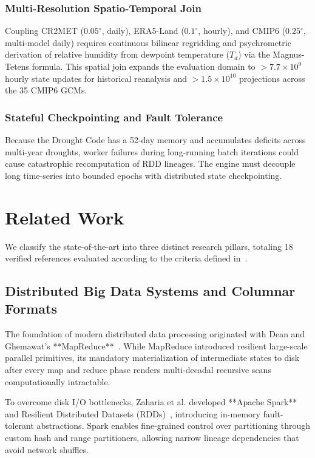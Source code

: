 \documentclass[10pt,conference]{IEEEtran}
\begin{document}
\subsubsection{Multi-Resolution Spatio-Temporal Join}
Coupling CR2MET ($0.05^\circ$, daily), ERA5-Land ($0.1^\circ$, hourly), and CMIP6 ($0.25^\circ$, multi-model daily) requires continuous bilinear regridding and psychrometric derivation of relative humidity from dewpoint temperature ($T_d$) via the Magnus-Tetens formula. This spatial join expands the evaluation domain to $>7.7 \times 10^9$ hourly state updates for historical reanalysis and $>1.5 \times 10^{10}$ projections across the 35 CMIP6 GCMs.

\subsubsection{Stateful Checkpointing and Fault Tolerance}
Because the Drought Code has a 52-day memory and accumulates deficits across multi-year droughts, worker failures during long-running batch iterations could cause catastrophic recomputation of RDD lineages. The engine must decouple long time-series into bounded epochs with distributed state checkpointing.

\section{Related Work}

We classify the state-of-the-art into three distinct research pillars, totaling 18 verified references evaluated according to the criteria defined in~\cite{paperinstructions}.

\subsection{Distributed Big Data Systems and Columnar Formats}
The foundation of modern distributed data processing originated with Dean and Ghemawat's **MapReduce**~\cite{dean2008mapreduce}. While MapReduce introduced resilient large-scale parallel primitives, its mandatory materialization of intermediate states to disk after every map and reduce phase renders multi-decadal recursive scans computationally intractable. 

To overcome disk I/O bottlenecks, Zaharia et al. developed **Apache Spark** and Resilient Distributed Datasets (RDDs)~\cite{zaharia2012resilient}, introducing in-memory fault-tolerant abstractions. Spark enables fine-grained control over partitioning through custom hash and range partitioners, allowing narrow lineage dependencies that avoid network shuffles. 
\end{document}
